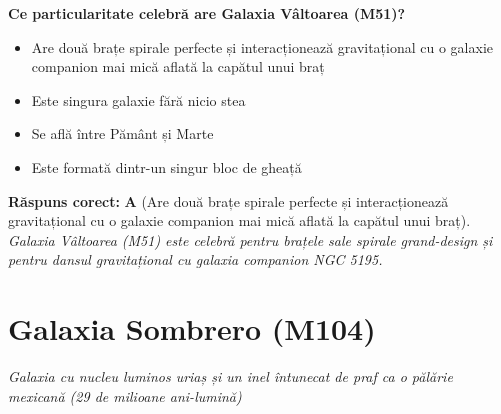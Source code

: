 \vspace{6pt}
\begin{tcolorbox}[orbitarquiz, title={\textbf{Întrebare de verificare \#73: Galaxia Vâltoarea (M51)}}]
\textbf{Ce particularitate celebră are Galaxia Vâltoarea (M51)?}
\begin{itemize}[leftmargin=2.2em, itemsep=2pt, topsep=4pt]
  \item[$\square$ \textbf{A.}] Are două brațe spirale perfecte și interacționează gravitațional cu o galaxie companion mai mică aflată la capătul unui braț
  \item[$\square$ \textbf{B.}] Este singura galaxie fără nicio stea
  \item[$\square$ \textbf{C.}] Se află între Pământ și Marte
  \item[$\square$ \textbf{D.}] Este formată dintr-un singur bloc de gheață
\end{itemize}
\vspace{2pt}
{\footnotesize\color{orbitarMuted}\textbf{Răspuns corect:} \textbf{A} (Are două brațe spirale perfecte și interacționează gravitațional cu o galaxie companion mai mică aflată la capătul unui braț). \emph{Galaxia Vâltoarea (M51) este celebră pentru brațele sale spirale grand-design și pentru dansul gravitațional cu galaxia companion NGC 5195.}}
\end{tcolorbox}
\clearpage


\section{Galaxia Sombrero (M104)}
\label{sec:body-sombrero_galaxy}
\vspace{-4pt}
{\large\itshape\color{orbitarAccent} Galaxia cu nucleu luminos uriaș și un inel întunecat de praf ca o pălărie mexicană (29 de milioane ani-lumină)}\\[4pt]



